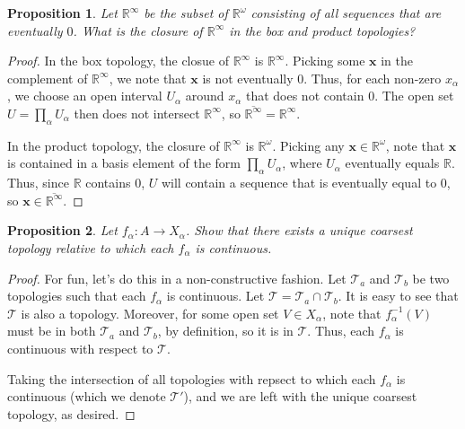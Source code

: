 \documentclass[10pt, oneside]{amsart}
\newtheorem{prop}{Proposition}
\newcommand{\bm}{\boldsymbol}
\begin{document}
    \begin{prop}
      Let $\mathbb{R}^{\infty}$ be the subset of $\mathbb{R}^{\omega}$ consisting of all sequences that are eventually $0$. What is the closure of $\mathbb{R}^{\infty}$ in the box and product topologies?
    \end{prop}

    \begin{proof}
      In the box topology, the closue of $\mathbb{R}^{\infty}$ is $\mathbb{R}^{\infty}$. Picking some $\bm{x}$ in the complement of $\mathbb{R}^{\infty}$, we note that $\bm{x}$ is not eventually $0$. Thus, for each
      non-zero $x_{\alpha}$, we choose an open interval $U_{\alpha}$ around $x_{\alpha}$ that does not contain $0$. The open set $U = \prod_{\alpha} U_{\alpha}$ then does not intersect $\mathbb{R}^{\infty}$, so
      $\overline{\mathbb{R}^{\infty}} = \mathbb{R}^{\infty}$.
      \newline

      In the product topology, the closure of $\mathbb{R}^{\infty}$ is $\mathbb{R}^{\omega}$. Picking any $\bm{x} \in \mathbb{R}^{\omega}$, note that $\bm{x}$ is contained in a basis element of the form $\prod_{\alpha} U_{\alpha}$,
      where $U_{\alpha}$ eventually equals $\mathbb{R}$. Thus, since $\mathbb{R}$ contains $0$, $U$ will contain a sequence that is eventually equal to $0$, so $\bm{x} \in \overline{\mathbb{R}^{\infty}}$.
    \end{proof}

    \begin{prop}
      Let $f_{\alpha} : A \rightarrow X_{\alpha}$. Show that there exists a unique coarsest topology relative to which each $f_{\alpha}$ is continuous.
    \end{prop}

    \begin{proof}
      For fun, let's do this in a non-constructive fashion. Let $\mathcal{T}_a$ and $\mathcal{T}_b$ be two topologies such that each $f_{\alpha}$ is continuous. Let $\mathcal{T} = \mathcal{T}_a \cap \mathcal{T}_b$.
      It is easy to see that $\mathcal{T}$ is also a topology. Moreover, for some open set $V \in X_{\alpha}$, note that $f^{-1}_{\alpha}(V)$ must be in both $\mathcal{T}_a$ and $\mathcal{T}_b$, by definition, so it is in $\mathcal{T}$.
      Thus, each $f_{\alpha}$ is continuous with respect to $\mathcal{T}$.
      \newline

      Taking the intersection of all topologies with repsect to which each $f_{\alpha}$ is continuous (which we denote $\mathcal{T}'$), and we are left with the unique coarsest topology, as desired.
    \end{proof}
\end{document}
